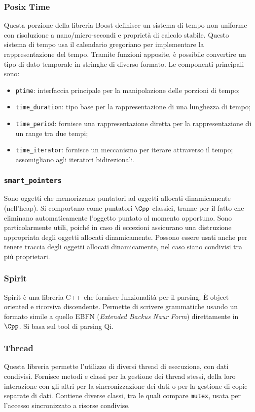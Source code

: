 \subsubsection{Posix Time}
Questa porzione della libreria Boost definisce un sistema di tempo non
uniforme con risoluzione a nano/micro-secondi e proprietà di calcolo
stabile.
Questo sistema di tempo usa il calendario gregoriano per implementare
la rappresentazione del tempo.
Tramite funzioni apposite, è possibile convertire un tipo di dato
temporale in stringhe di diverso formato.
Le componenti principali sono:
\begin{itemize}
  \item {\tt ptime}: interfaccia principale per la manipolazione delle
  porzioni di tempo;
  \item {\tt time\_duration}: tipo base per la rappresentazione di una
  lunghezza di tempo;
  \item {\tt time\_period}: fornisce una rappresentazione diretta per la
  rappresentazione di un range tra due tempi;
  \item {\tt time\_iterator}: fornisce un meccanismo per iterare
  attraverso il tempo; assomigliano agli iteratori bidirezionali.
\end{itemize}

\subsubsection{{\tt smart\_pointers}}
Sono oggetti che memorizzano puntatori ad oggetti allocati dinamicamente
(nell'heap). Si comportano come puntatori $\Cpp$ classici, tranne per il
fatto che eliminano automaticamente l'oggetto puntato al momento
opportuno. Sono particolarmente utili, poiché in caso di eccezioni
assicurano una distruzione appropriata degli oggetti allocati
dinamicamente. Possono essere usati anche per tenere traccia degli
oggetti allocati dinamicamente, nel caso siano condivisi tra più
proprietari.

\subsubsection{Spirit}
Spirit è una libreria C++ che fornisce funzionalità per il parsing.
È object-oriented e ricorsiva discendente.
Permette di scrivere grammatiche usando un formato simile a quello EBFN
(\textit{Extended Backus Naur Form}) direttamente in $\Cpp$.
Si basa sul tool di parsing Qi.

\subsubsection{Thread}
Questa libreria permette l'utilizzo di diversi thread di esecuzione,
con dati condivisi.
Fornisce metodi e classi per la gestione dei thread stessi, della loro
interazione con gli altri per la sincronizzazione dei dati o per la
gestione di copie separate di dati.
Contiene diverse classi, tra le quali compare {\tt mutex}, usata per
l'accesso sincronizzato a risorse condivise.

